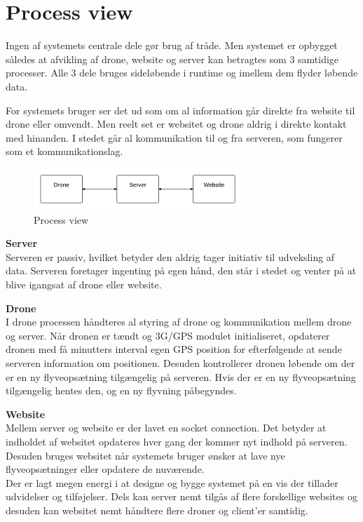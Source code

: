 \section{Process view}

Ingen af systemets centrale dele gør brug af tråde. Men systemet er opbygget således at afvikling af drone, website og server kan betragtes som 3 samtidige processer. Alle 3 dele bruges sideløbende i runtime og imellem dem flyder løbende data.

For systemets bruger ser det ud som om al information går direkte fra website til drone eller omvendt. Men reelt set er websitet og drone aldrig i direkte kontakt med hinanden. I stedet går al kommunikation til og fra serveren, som fungerer som et kommunikationslag. 

\vspace{-5pt}
\begin{figure}[H]
	\centering
	\includegraphics[width=0.7\textwidth]{Billeder/process_view}
	\vspace{0cm}
	\caption{Process view}
	\label{fig:process_view}
\end{figure}

\textbf{Server}\\
Serveren er passiv, hvilket betyder den aldrig tager initiativ til udveksling af data. Serveren foretager ingenting på egen hånd, den står i stedet og venter på at blive igangsat af drone eller website. 
 
\textbf{Drone} \\
I drone processen håndteres al styring af drone og kommunikation mellem drone og server. Når dronen er tændt og 3G/GPS modulet initialiseret, opdaterer dronen med få minutters interval egen GPS position for efterfølgende at sende serveren information om positionen. Desuden kontrollerer dronen løbende om der er en ny flyveopsætning tilgængelig på serveren. Hvis der er en ny flyveopsætning tilgængelig hentes den, og en ny flyvning påbegyndes. 

\textbf{Website}\\
Mellem server og website er der lavet en socket connection. Det betyder at indholdet af websitet opdateres hver gang der kommer nyt indhold på serveren. Desuden bruges websitet når systemets bruger ønsker at lave nye flyveopsætninger eller opdatere de nuværende.\\


Der er lagt megen energi i at designe og bygge systemet på en vis der tillader udvidelser og tilføjelser. Dels kan server nemt tilgås af flere forskellige websites og desuden kan websitet nemt håndtere flere droner og client’er samtidig.